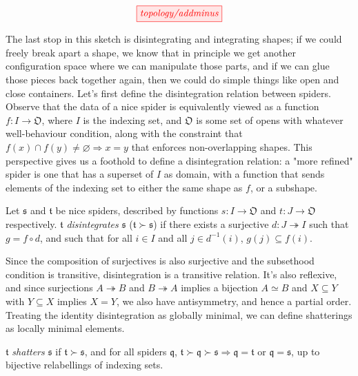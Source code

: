 \[\tikzfig{topology/addminus}\]

The last stop in this sketch is disintegrating and integrating shapes; if we could freely break apart a shape, we know that in principle we get another configuration space where we can manipulate those parts, and if we can glue those pieces back together again, then we could do simple things like open and close containers. Let's first define the disintegration relation between spiders. Observe that the data of a nice spider is equivalently viewed as a function $f: I \rightarrow \mathfrak{O}$, where $I$ is the indexing set, and $\mathfrak{O}$ is some set of opens with whatever well-behaviour condition, along with the constraint that $f(x) \cap f(y) \neq \varnothing \Rightarrow x = y$ that enforces non-overlapping shapes. This perspective gives us a foothold to define a disintegration relation: a "more refined" spider is one that has a superset of $I$ as domain, with a function that sends elements of the indexing set to either the same shape as $f$, or a subshape.

\begin{defn}[Disintegration]
Let $\mathfrak{s}$ and $\mathfrak{t}$ be nice spiders, described by functions $s: I \rightarrow \mathfrak{O}$ and $t: J \rightarrow \mathfrak{O}$ respectively. $\mathfrak{t}$ \emph{disintegrates} $\mathfrak{s}$ ($\mathfrak{t} \succ \mathfrak{s}$) if there exists a surjective $d: J \twoheadrightarrow I$ such that $g = f \circ d$, and such that for all $i \in I$ and all $j \in d^{-1}(i)$, $g(j) \subseteq f(i)$.
\end{defn}

Since the composition of surjectives is also surjective and the subsethood condition is transitive, disintegration is a transitive relation. It's also reflexive, and since surjections $A \twoheadrightarrow B$ and $B \twoheadrightarrow A$ implies a bijection $A \simeq B$ and $X \subseteq Y$ with $Y \subseteq X$ implies $X = Y$, we also have antisymmetry, and hence a partial order. Treating the identity disintegration as globally minimal, we can define shatterings as locally minimal elements.

\begin{defn}
$\mathfrak{t}$ \emph{shatters} $\mathfrak{s}$ if $\mathfrak{t} \succ \mathfrak{s}$, and for all spiders $\mathfrak{q}$, $\mathfrak{t} \succ \mathfrak{q} \succ \mathfrak{s} \Rightarrow \mathfrak{q} = \mathfrak{t}$ or $\mathfrak{q} = \mathfrak{s}$, up to bijective relabellings of indexing sets.
\end{defn}

